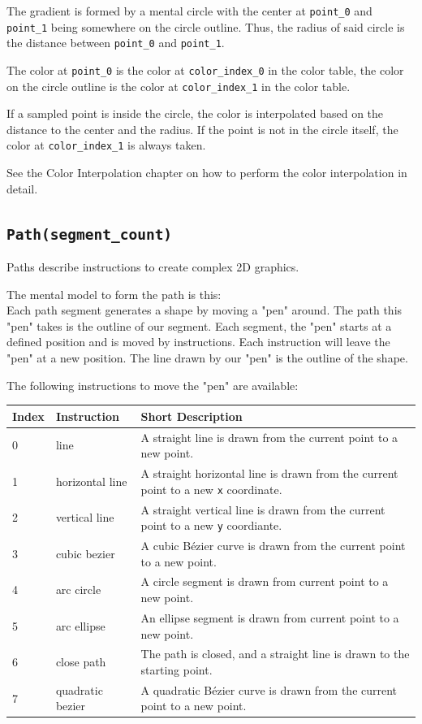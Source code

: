 \documentclass[]{article}
\begin{document}
The gradient is formed by a mental circle with the center at
\texttt{point\_0} and \texttt{point\_1} being somewhere on the circle
outline. Thus, the radius of said circle is the distance between
\texttt{point\_0} and \texttt{point\_1}.

The color at \texttt{point\_0} is the color at \texttt{color\_index\_0}
in the color table, the color on the circle outline is the color at
\texttt{color\_index\_1} in the color table.

If a sampled point is inside the circle, the color is interpolated based
on the distance to the center and the radius. If the point is
not in the circle itself, the color at \texttt{color\_index\_1} is
always taken.

See the \hypertarget{color-interpolation}{Color Interpolation} chapter on how to perform the color interpolation in detail.

\hypertarget{pathsegment_count}{\subsection{\texorpdfstring{\texttt{Path(segment\_count)}}{Path(segment\_count)}}\label{pathsegment_count}}

Paths describe instructions to create complex 2D graphics.

The mental model to form the path is this:\\
Each path segment generates a shape by moving a "pen" around. The path
this "pen" takes is the outline of our segment. Each segment, the "pen"
starts at a defined position and is moved by instructions. Each
instruction will leave the "pen" at a new position. The line drawn by
our "pen" is the outline of the shape.

The following instructions to move the "pen" are available:

\begin{longtable}[]{@{}p{0.5in}p{1.0in}p{4.5in}@{}}
\toprule
Index & Instruction & Short Description \\
\midrule
\endhead
0 & line             & A straight line is drawn from the current point to a new point. \\
1 & horizontal line  & A straight horizontal line is drawn from the current point to a new \texttt{x} coordinate. \\
2 & vertical line    & A straight vertical line is drawn from the current point to a new \texttt{y} coordiante. \\
3 & cubic bezier     & A cubic Bézier curve is drawn from the current point to a new point. \\
4 & arc circle       & A circle segment is drawn from current point to a new point. \\
5 & arc ellipse      & An ellipse segment is drawn from current point to a new point. \\
6 & close path       & The path is closed, and a straight line is drawn to the starting point. \\
7 & quadratic bezier & A quadratic Bézier curve is drawn from the current point to a new point. \\
\bottomrule
\end{longtable}
\end{document}
